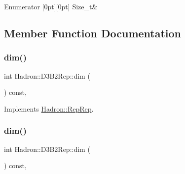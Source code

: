 \begin{DoxyEnumFields}{Enumerator}
[0pt][0pt]{}\mbox{\label{structHadron_1_1D3B2Rep_a77cf195921515cfbe13e6eee6a251049acdb28279ffcc9850d9a8bdc8fa24cd53}} 
Size\+\_\+t&\\
\hline

\end{DoxyEnumFields}


\subsection{Member Function Documentation}
\mbox{\label{structHadron_1_1D3B2Rep_a5b1737e056dda55a033851622de1412c}} 
\subsubsection{\texorpdfstring{dim()}{dim()}\hspace{0.1cm}{\footnotesize\ttfamily [1/3]}}
{\footnotesize\ttfamily int Hadron\+::\+D3\+B2\+Rep\+::dim (\begin{DoxyParamCaption}{ }\end{DoxyParamCaption}) const\hspace{0.3cm}{\ttfamily [inline]}, {\ttfamily [virtual]}}



Implements \mbox{\hyperlink{structHadron_1_1RepRep_a92c8802e5ed7afd7da43ccfd5b7cd92b}{Hadron\+::\+Rep\+Rep}}.

\mbox{\label{structHadron_1_1D3B2Rep_a5b1737e056dda55a033851622de1412c}} 
\subsubsection{\texorpdfstring{dim()}{dim()}\hspace{0.1cm}{\footnotesize\ttfamily [2/3]}}
{\footnotesize\ttfamily int Hadron\+::\+D3\+B2\+Rep\+::dim (\begin{DoxyParamCaption}{ }\end{DoxyParamCaption}) const\hspace{0.3cm}{\ttfamily [inline]}, {\ttfamily [virtual]}}



